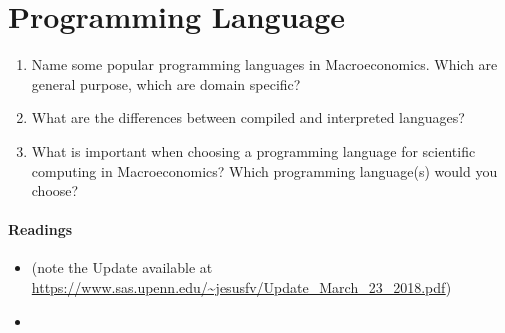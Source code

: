 \section[Programming Language]{Programming Language\label{ex:ProgrammingLanguage}}
\begin{enumerate}
	\item Name some popular programming languages in Macroeconomics. Which are general purpose, which are domain specific?
	\item What are the differences between compiled and interpreted languages?
	\item What is important when choosing a programming language for scientific computing in Macroeconomics? Which programming language(s) would you choose?
\end{enumerate}

\paragraph{Readings} 
\begin{itemize}
	\item \textcite{Aruoba.Fernandez-Villaverde_2015_ComparisonProgrammingLanguages} (note the Update available at \url{https://www.sas.upenn.edu/~jesusfv/Update_March_23_2018.pdf})
	\item \textcite{Aguirre.Danielsson_2020_WhichProgrammingLanguage}
\end{itemize}

